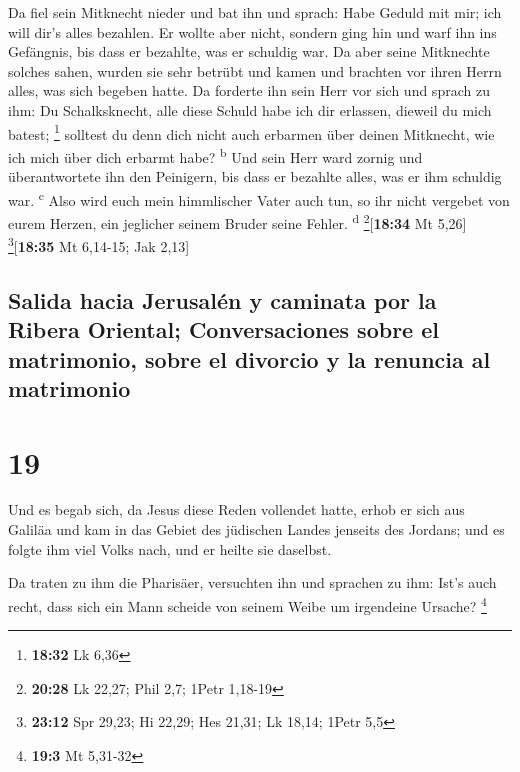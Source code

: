  Da fiel sein Mitknecht nieder und bat ihn und sprach:
Habe Geduld mit mir; ich will dir's alles bezahlen.  Er
wollte aber nicht, sondern ging hin und warf ihn ins Gefängnis, bis dass
er bezahlte, was er schuldig war.  Da aber seine
Mitknechte solches sahen, wurden sie sehr betrübt und kamen und brachten
vor ihren Herrn alles, was sich begeben hatte.  Da
forderte ihn sein Herr vor sich und sprach zu ihm: Du Schalksknecht,
alle diese Schuld habe ich dir erlassen, dieweil du mich batest;
\footnote{\textbf{18:32} Lk 6,36}  solltest du denn dich
nicht auch erbarmen über deinen Mitknecht, wie ich mich über dich
erbarmt habe? \textsuperscript{b}  Und sein Herr ward
zornig und überantwortete ihn den Peinigern, bis dass er bezahlte alles,
was er ihm schuldig war. \textsuperscript{c}  Also wird
euch mein himmlischer Vater auch tun, so ihr nicht vergebet von eurem
Herzen, ein jeglicher seinem Bruder seine Fehler. \textsuperscript{d}
\footnote{\textbf{20:28} Lk 22,27; Phil 2,7; 1Petr 1,18-19}{[}\textbf{18:34}
Mt 5,26{]} \footnote{\textbf{23:12} Spr 29,23; Hi 22,29; Hes 21,31; Lk
  18,14; 1Petr 5,5}{[}\textbf{18:35} Mt 6,14-15; Jak 2,13{]}

\hypertarget{salida-hacia-jerusaluxe9n-y-caminata-por-la-ribera-oriental-conversaciones-sobre-el-matrimonio-sobre-el-divorcio-y-la-renuncia-al-matrimonio}{%
\subsection{Salida hacia Jerusalén y caminata por la Ribera Oriental;
Conversaciones sobre el matrimonio, sobre el divorcio y la renuncia al
matrimonio}\label{salida-hacia-jerusaluxe9n-y-caminata-por-la-ribera-oriental-conversaciones-sobre-el-matrimonio-sobre-el-divorcio-y-la-renuncia-al-matrimonio}}

\hypertarget{section-18}{%
\section{19}\label{section-18}}

 Und es begab sich, da Jesus diese Reden vollendet hatte,
erhob er sich aus Galiläa und kam in das Gebiet des jüdischen Landes
jenseits des Jordans;  und es folgte ihm viel Volks nach,
und er heilte sie daselbst.

 Da traten zu ihm die Pharisäer, versuchten ihn und
sprachen zu ihm: Ist's auch recht, dass sich ein Mann scheide von seinem
Weibe um irgendeine Ursache? \footnote{\textbf{19:3} Mt 5,31-32}

